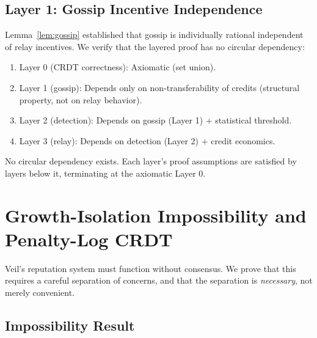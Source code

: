 \documentclass[11pt,a4paper]{article}
\begin{document}
\subsection{Layer 1: Gossip Incentive Independence}
\label{sec:gossip-incentive}

Lemma~\ref{lem:gossip} established that gossip is individually rational independent of relay incentives. We verify that the layered proof has no circular dependency:

\begin{enumerate}[nosep]
    \item Layer 0 (CRDT correctness): Axiomatic (set union).
    \item Layer 1 (gossip): Depends only on non-transferability of credits (structural property, not on relay behavior).
    \item Layer 2 (detection): Depends on gossip (Layer 1) + statistical threshold.
    \item Layer 3 (relay): Depends on detection (Layer 2) + credit economics.
\end{enumerate}

No circular dependency exists. Each layer's proof assumptions are satisfied by layers below it, terminating at the axiomatic Layer 0.


\section{Growth-Isolation Impossibility and Penalty-Log CRDT}
\label{sec:crdt-theorem}

Veil's reputation system must function without consensus. We prove that this requires a careful separation of concerns, and that the separation is \emph{necessary}, not merely convenient.

\subsection{Impossibility Result}
\end{document}

